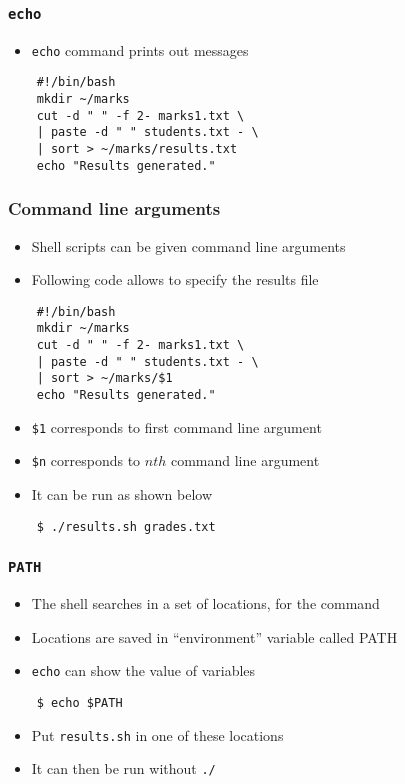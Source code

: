 \documentclass[12pt,compress]{beamer}
\begin{document}
\begin{frame}[fragile]
  \frametitle{\texttt{echo}}
  \begin{itemize}
  \item \texttt{echo} command prints out messages
  \end{itemize}
  \begin{lstlisting}
    #!/bin/bash
    mkdir ~/marks
    cut -d " " -f 2- marks1.txt \
    | paste -d " " students.txt - \
    | sort > ~/marks/results.txt
    echo "Results generated."
  \end{lstlisting} %
\end{frame}

\begin{frame}[fragile]
  \frametitle{Command line arguments}
  \begin{itemize}
  \item Shell scripts can be given command line arguments
  \item Following code allows to specify the results file
  \end{itemize}
  \begin{lstlisting}
    #!/bin/bash
    mkdir ~/marks
    cut -d " " -f 2- marks1.txt \
    | paste -d " " students.txt - \
    | sort > ~/marks/$1
    echo "Results generated."
  \end{lstlisting} %
  \begin{itemize}
  \item \texttt{\$1} corresponds to first command line argument 
  \item \texttt{\$n} corresponds to $n{th}$ command line argument
  \item It can be run as shown below
  \end{itemize}
  \begin{lstlisting}
    $ ./results.sh grades.txt
  \end{lstlisting} %
\end{frame}

\begin{frame}[fragile]
  \frametitle{\texttt{PATH}}
  \begin{itemize}
  \item The shell searches in a set of locations, for the command 
  \item Locations are saved in ``environment'' variable called PATH
  \item \texttt{echo} can show the value of variables
  \end{itemize}
  \begin{lstlisting}
    $ echo $PATH
  \end{lstlisting} %
  \begin{itemize}
  \item Put \texttt{results.sh} in one of these locations
  \item It can then be run without \texttt{./} 
  \end{itemize}
\end{frame}
\end{document}
